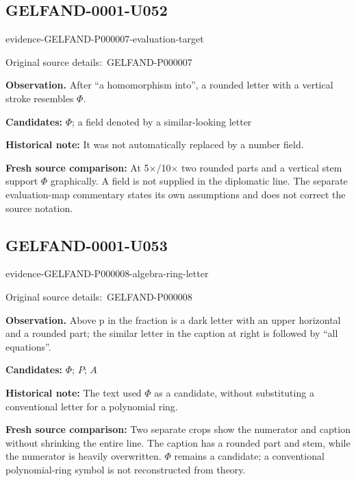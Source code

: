 \documentclass[11pt]{article}
\newcommand{\EvidenceBlock}[4]{%
 \par\smallskip\noindent\begin{minipage}{\linewidth}
 \begin{minipage}[t]{.47\linewidth}\vspace{0pt}\centering
 \csname evidence-#1-#2\endcsname\par
 {\scriptsize\SourceCropCaption\ #1}\par
 \end{minipage}\hfill
 \begin{minipage}[t]{.49\linewidth}\vspace{0pt}\raggedright
 {\small\color{orange!65!black}\textbf{#4} #3}\par
 \end{minipage}
 \end{minipage}\par\smallskip}
\newcommand{\SourceCropCaption}{Original source details:}\newcommand{\ReadingCaption}{Uncertain reading.}\newcommand{\IncompleteCaption}{Undeciphered passage.}\newcommand{\DiagramCaption}{Diagram and typed description.}
\begin{document}
\subsection*{GELFAND-0001-U052}
\EvidenceBlock{GELFAND-P000007}{evaluation-target}{After “a homomorphism into”, a rounded letter with a vertical stroke resembles \(\Phi\).}{Observation.}
\par\smallskip\noindent\textbf{Candidates: } \(\Phi\); a field denoted by a similar-looking letter\par
\par\smallskip\noindent\textbf{Historical note: } It was not automatically replaced by a number field.\par
\par\smallskip\noindent\textbf{Fresh source comparison: } At 5×/10× two rounded parts and a vertical stem support \(\Phi\) graphically. A field is not supplied in the diplomatic line. The separate evaluation-map commentary states its own assumptions and does not correct the source notation.\par

\subsection*{GELFAND-0001-U053}
\EvidenceBlock{GELFAND-P000008}{algebra-ring-letter}{Above p in the fraction is a dark letter with an upper horizontal and a rounded part; the similar letter in the caption at right is followed by “all equations”.}{Observation.}
\par\smallskip\noindent\textbf{Candidates: } \(\Phi\); \(P\); \(A\)\par
\par\smallskip\noindent\textbf{Historical note: } The text used \(\Phi\) as a candidate, without substituting a conventional letter for a polynomial ring.\par
\par\smallskip\noindent\textbf{Fresh source comparison: } Two separate crops show the numerator and caption without shrinking the entire line. The caption has a rounded part and stem, while the numerator is heavily overwritten. \(\Phi\) remains a candidate; a conventional polynomial-ring symbol is not reconstructed from theory.\par
\end{document}
